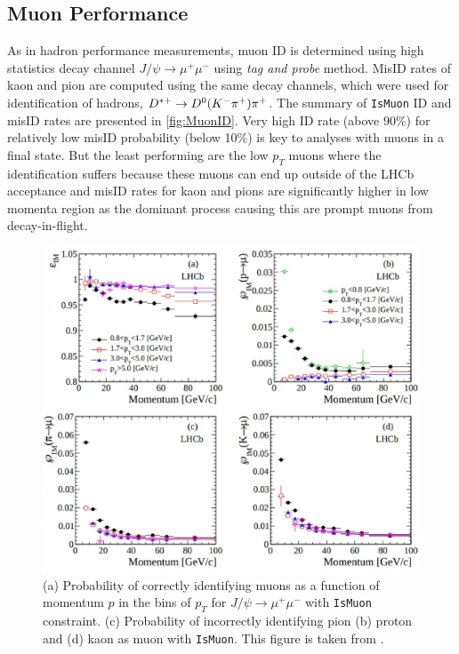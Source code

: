 \subsection{Muon Performance }
\label{muonperf}
As in hadron performance measurements, muon ID is determined using high statistics decay channel $J/\psi \rightarrow \mu^{+} \mu^{-}$ using \textit{tag and probe} method. MisID rates of kaon and pion are computed using the same decay channels, which were used for identification of hadrons, $D^{*+} \rightarrow D^{0}({K}^{-}{{\pi}^+}){{\pi}^+}$. The summary of \texttt{IsMuon} \Gls{ID} and misID rates are presented in \autoref{fig:MuonID}. Very high ID rate (above 90\%) for relatively low misID probability (below 10\%) is key to analyses with muons in a final state. But the least performing are the low $p_{T}$ muons where the identification suffers because these muons can end up outside of the \gls{LHCb} acceptance and misID rates for kaon and pions are significantly higher in low momenta region as the dominant process causing this are prompt muons from decay-in-flight.   

\begin{figure}[!h]
	\includegraphics[width = 1.0\textwidth]{figs/detector/MuonPIDIsMuon.eps}%
	\caption{(a) Probability of correctly identifying muons as a function of momentum $p$ in the bins of $p_{T}$ for $J/\psi \rightarrow \mu^{+} \mu^{-}$ with \texttt{IsMuon} constraint. (c) Probability of incorrectly identifying pion (b) proton and (d) kaon as muon with \texttt{IsMuon}. This figure is taken from \cite{LHCb-DP-2013-001}. }  
	\label{fig:MuonID}
\end{figure}


